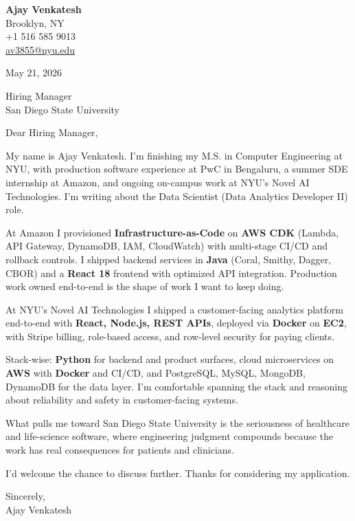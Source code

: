\documentclass[letterpaper,11pt]{article}
\begin{document}
\begin{flushleft}
\textbf{\large Ajay Venkatesh} \\
Brooklyn, NY \\
+1 516 585 9013 \\
\href{mailto:av3855@nyu.edu}{av3855@nyu.edu}
\end{flushleft}

\vspace{10pt}

May 21, 2026

\vspace{6pt}

Hiring Manager \\
San Diego State University

\vspace{10pt}

Dear Hiring Manager,

My name is Ajay Venkatesh. I'm finishing my M.S. in Computer Engineering at NYU, with production software experience at PwC in Bengaluru, a summer SDE internship at Amazon, and ongoing on-campus work at NYU's Novel AI Technologies. I'm writing about the Data Scientist (Data Analytics Developer II) role.

At Amazon I provisioned \textbf{Infrastructure-as-Code} on \textbf{AWS CDK} (Lambda, API Gateway, DynamoDB, IAM, CloudWatch) with multi-stage CI/CD and rollback controls. I shipped backend services in \textbf{Java} (Coral, Smithy, Dagger, CBOR) and a \textbf{React 18} frontend with optimized API integration. Production work owned end-to-end is the shape of work I want to keep doing.

At NYU's Novel AI Technologies I shipped a customer-facing analytics platform end-to-end with \textbf{React, Node.js, REST APIs}, deployed via \textbf{Docker} on \textbf{EC2}, with Stripe billing, role-based access, and row-level security for paying clients.

Stack-wise: \textbf{Python} for backend and product surfaces, cloud microservices on \textbf{AWS} with \textbf{Docker} and CI/CD, and PostgreSQL, MySQL, MongoDB, DynamoDB for the data layer. I'm comfortable spanning the stack and reasoning about reliability and safety in customer-facing systems.

What pulls me toward San Diego State University is the seriousness of healthcare and life-science software, where engineering judgment compounds because the work has real consequences for patients and clinicians.

I'd welcome the chance to discuss further. Thanks for considering my application.

\vspace{12pt}

Sincerely, \\
Ajay Venkatesh
\end{document}
